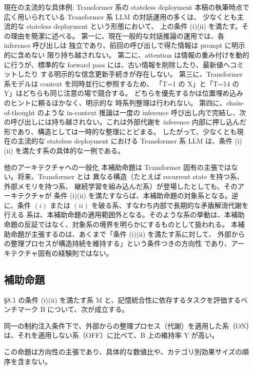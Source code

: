 \documentclass[12pt,a4paper]{article}
\begin{document}
現在の主流的な具体例: Transformer 系の stateless deployment 本稿の執筆時点で広く用いられている Transformer 系 LLM の対話運用の多くは、 少なくとも主流的な stateless deployment という形態において、 上の条件 (i)(ii) を満たす。その理由を簡潔に述べる。 第一に、現在一般的な対話推論の運用では、各 inference 呼び出しは 独立であり、前回の呼び出しで得た情報は prompt に明示的に含めない 限り持ち越されない。 第二に、attention は情報の重み付けを動的に行うが、標準的な forward pass には、古い情報を削除したり、最新値へコミットしたり する明示的な信念更新手続きが存在しない。 第三に、Transformer 系モデルは context を同時並行に参照するため、 「T=1 の X」と「T=14 の Y」はどちらも同じ注意の場で競合する。 どちらを優先するかは位置埋め込みのヒントに頼るほかなく、明示的な 時系列整理は行われない。 第四に、chain-of-thought のような in-context 推論は一度の inference 呼び出し内で完結し、次の呼び出しには持ち越されない。これは外部代謝を inference 内部に押し込んだ形であり、構造としては一時的な整理にとどまる。 したがって、少なくとも現在の主流的な stateless deployment における Transformer 系 LLM は、条件 (i)(ii) を満たす系の具体的な一例である。

他のアーキテクチャへの一般化 本補助命題は Transformer 固有の主張ではない。将来、Transformer とは 異なる構造（たとえば recurrent state を持つ系、外部メモリを持つ系、 継続学習を組み込んだ系）が登場したとしても、そのアーキテクチャが 条件 (i)(ii) を満たすならば、本補助命題の対象系となる。逆に、条件 \((i)\) または \((ii)\) を破る系、すなわち内部で長期的な矛盾解消代謝を行える 系は、本補助命題の適用範囲外となる。そのような系の挙動は、本補助 命題の反証ではなく、対象系の境界を明らかにするものとして扱われる。 本補助命題が主張するのは、あくまで「条件 (i)(ii) を満たす系に対して、 外部からの整理プロセスが構造持続を維持する」という条件つきの方向性 であり、アーキテクチャ固有の経験則ではない。

\subsection{補助命題}\label{ux88dcux52a9ux547dux984c}

\begin{lemma}[補助命題]
§8.1 の条件 (i)(ii) を満たす系 M と、記憶統合性に依存するタスクを評価するベンチマーク B について、次が成立する。

同一の制約注入条件下で、外部からの整理プロセス（代謝）を適用した系（ON）は、それを適用しない系（OFF）に比べて、B 上の維持率 Y が高い。

この命題は方向性の主張であり、具体的な数値比や、カテゴリ別効果サイズの順序を含まない。
\end{lemma}
\end{document}
